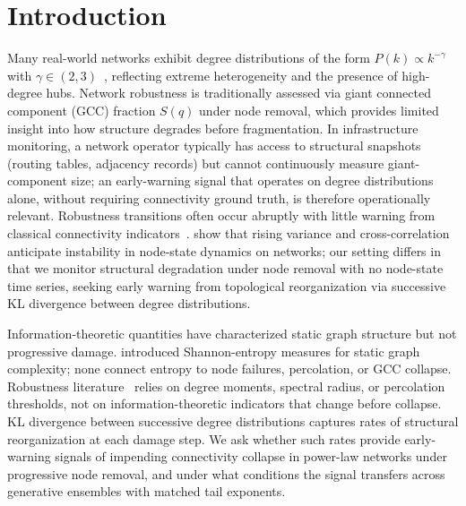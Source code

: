 \documentclass{nws}
\begin{document}
\maketitle

\section{Introduction}
Many real-world networks exhibit degree distributions of the form $P(k)\propto k^{-\gamma}$
with $\gamma\in(2,3)$~\citep{newman2003structure,barabasi1999scaling}, reflecting extreme
heterogeneity and the presence of high-degree hubs. 
Network robustness is traditionally
assessed via giant connected component (GCC) fraction $S(q)$ under node removal, which provides limited insight into
how structure degrades before fragmentation. 
In infrastructure monitoring, a network operator typically has access to structural
snapshots (routing tables, adjacency records) but cannot continuously measure giant-component
size; an early-warning signal that operates on degree distributions alone, without requiring
connectivity ground truth, is therefore operationally relevant.
Robustness transitions often occur abruptly
with little warning from classical connectivity indicators~\citep{radicchi2024robustness}.
\citet{suweis2014earlywarning} show that rising variance and
cross-correlation anticipate instability in node-state dynamics on networks; our setting
differs in that we monitor structural degradation under node removal with no node-state
time series, seeking early warning from topological reorganization via successive KL
divergence between degree distributions.

Information-theoretic quantities have characterized static graph structure but not progressive
damage. \citet{dehmer2008information} introduced Shannon-entropy measures for static
graph complexity; none connect entropy to node failures, percolation, or GCC collapse.
Robustness literature~\citep{albert2000error,cohen2000resilience,radicchi2024robustness}
relies on degree moments, spectral radius, or percolation thresholds, not on
information-theoretic indicators that change before collapse. KL divergence between successive degree distributions captures rates of structural
reorganization at each damage step. We ask whether such rates provide early-warning signals of impending
connectivity collapse in power-law networks under progressive node removal, and under what
conditions the signal transfers across generative ensembles with matched tail exponents.
\end{document}
